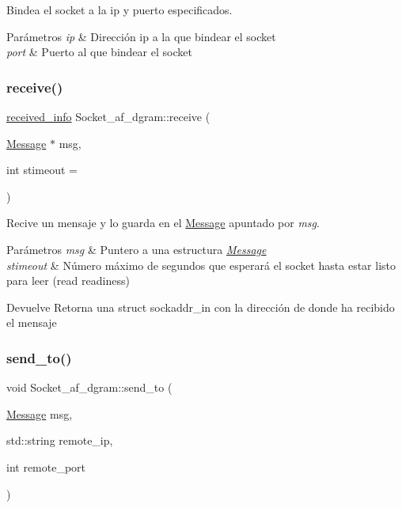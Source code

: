 Bindea el socket a la ip y puerto especificados. 


\begin{DoxyParams}{Parámetros}
{\em ip} & Dirección ip a la que bindear el socket \\
\hline
{\em port} & Puerto al que bindear el socket \\
\hline
\end{DoxyParams}
\mbox{\label{classSocket__af__dgram_ac7d122d2317d980c48964076c3c7e2bb}} 
\subsubsection{\texorpdfstring{receive()}{receive()}}
{\footnotesize\ttfamily \hyperlink{structreceived__info}{received\+\_\+info} Socket\+\_\+af\+\_\+dgram\+::receive (\begin{DoxyParamCaption}\item[{\hyperlink{structMessage}{Message} $\ast$}]{msg,  }\item[{int}]{stimeout = {} }\end{DoxyParamCaption})}



Recive un mensaje y lo guarda en el \hyperlink{structMessage}{Message} apuntado por {\itshape msg}. 


\begin{DoxyParams}{Parámetros}
{\em msg} & Puntero a una estructura {\itshape \hyperlink{structMessage}{Message}} \\
\hline
{\em stimeout} & Número máximo de segundos que esperará el socket hasta estar listo para leer (read readiness) \\
\hline
\end{DoxyParams}
\begin{DoxyReturn}{Devuelve}
Retorna una struct sockaddr\+\_\+in con la dirección de donde ha recibido el mensaje 
\end{DoxyReturn}
\mbox{\label{classSocket__af__dgram_a744bb661eeebe5b5cdfca0028da6bd88}} 
\subsubsection{\texorpdfstring{send\+\_\+to()}{send\_to()}}
{\footnotesize\ttfamily void Socket\+\_\+af\+\_\+dgram\+::send\+\_\+to (\begin{DoxyParamCaption}\item[{\hyperlink{structMessage}{Message}}]{msg,  }\item[{std\+::string}]{remote\+\_\+ip,  }\item[{int}]{remote\+\_\+port }\end{DoxyParamCaption})}



